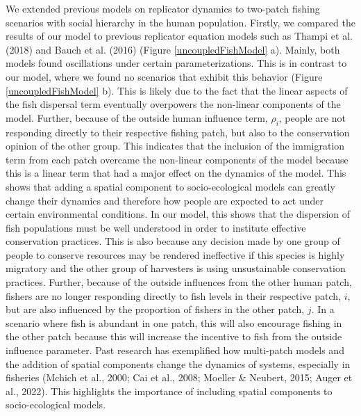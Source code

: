 \documentclass[
  12pt,
]{article}
\begin{document}
We extended previous models on replicator dynamics to two-patch fishing scenarios with social hierarchy in the human population. Firstly, we compared the results of our model to previous replicator equation models such as Thampi et al. (2018) and Bauch et al. (2016) (Figure \ref{uncoupledFishModel} a). Mainly, both models found oscillations under certain parameterizations. This is in contrast to our model, where we found no scenarios that exhibit this behavior (Figure \ref{uncoupledFishModel} b). This is likely due to the fact that the linear aspects of the fish dispersal term eventually overpowers the non-linear components of the model. Further, because of the outside human influence term, \(\rho_i\), people are not responding directly to their respective fishing patch, but also to the conservation opinion of the other group. This indicates that the inclusion of the immigration term from each patch overcame the non-linear components of the model because this is a linear term that had a major effect on the dynamics of the model. This shows that adding a spatial component to socio-ecological models can greatly change their dynamics and therefore how people are expected to act under certain environmental conditions. In our model, this shows that the dispersion of fish populations must be well understood in order to institute effective conservation practices. This is also because any decision made by one group of people to conserve resources may be rendered ineffective if this species is highly migratory and the other group of harvesters is using unsustainable conservation practices. Further, because of the outside influences from the other human patch, fishers are no longer responding directly to fish levels in their respective patch, \(i\), but are also influenced by the proportion of fishers in the other patch, \(j\). In a scenario where fish is abundant in one patch, this will also encourage fishing in the other patch because this will increase the incentive to fish from the outside influence parameter. Past research has exemplified how multi-patch models and the addition of spatial components change the dynamics of systems, especially in fisheries (Mchich et al., 2000; Cai et al., 2008; Moeller \& Neubert, 2015; Auger et al., 2022). This highlights the importance of including spatial components to socio-ecological models.
\end{document}
